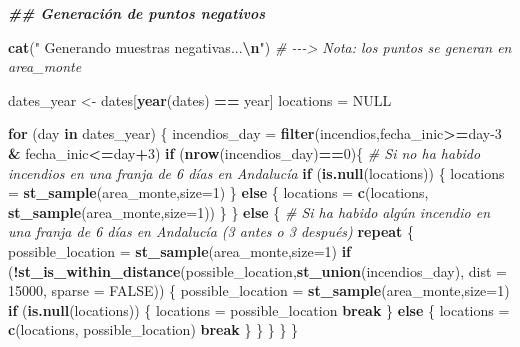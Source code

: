 \documentclass[12pt,a4paper,]{book}
\newenvironment{Shaded}{\begin{snugshade}}{\end{snugshade}}
\newcommand{\AttributeTok}[1]{\textcolor[rgb]{0.13,0.29,0.53}{#1}}
\newcommand{\CommentTok}[1]{\textcolor[rgb]{0.56,0.35,0.01}{\textit{#1}}}
\newcommand{\ConstantTok}[1]{\textcolor[rgb]{0.56,0.35,0.01}{#1}}
\newcommand{\ControlFlowTok}[1]{\textcolor[rgb]{0.13,0.29,0.53}{\textbf{#1}}}
\newcommand{\DecValTok}[1]{\textcolor[rgb]{0.00,0.00,0.81}{#1}}
\newcommand{\DocumentationTok}[1]{\textcolor[rgb]{0.56,0.35,0.01}{\textbf{\textit{#1}}}}
\newcommand{\FunctionTok}[1]{\textcolor[rgb]{0.13,0.29,0.53}{\textbf{#1}}}
\newcommand{\NormalTok}[1]{#1}
\newcommand{\OtherTok}[1]{\textcolor[rgb]{0.56,0.35,0.01}{#1}}
\newcommand{\SpecialCharTok}[1]{\textcolor[rgb]{0.81,0.36,0.00}{\textbf{#1}}}
\newcommand{\StringTok}[1]{\textcolor[rgb]{0.31,0.60,0.02}{#1}}
\numberwithin{dummy}{section}
\theoremstyle{ocrenumbox}
\theoremstyle{blacknumex}
\theoremstyle{blacknumbox}
\theoremstyle{ocrenum}
\theoremstyle{ocrenum}
\begin{document}
\begin{Shaded}
\begin{Highlighting}[]
  \DocumentationTok{\#\# Generación de puntos negativos}
  
  \FunctionTok{cat}\NormalTok{(}\StringTok{"  Generando muestras negativas...}\SpecialCharTok{\textbackslash{}n}\StringTok{"}\NormalTok{)}
  \CommentTok{\# {-}{-}{-}\textgreater{} Nota: los puntos se generan en area\_monte}
  
\NormalTok{  dates\_year }\OtherTok{\textless{}{-}}\NormalTok{ dates[}\FunctionTok{year}\NormalTok{(dates) }\SpecialCharTok{==}\NormalTok{ year]}
\NormalTok{  locations }\OtherTok{=} \ConstantTok{NULL}
  
  \ControlFlowTok{for}\NormalTok{ (day }\ControlFlowTok{in}\NormalTok{ dates\_year) \{}
\NormalTok{    incendios\_day }\OtherTok{=} \FunctionTok{filter}\NormalTok{(incendios,fecha\_inic}\SpecialCharTok{\textgreater{}=}\NormalTok{day}\DecValTok{{-}3} \SpecialCharTok{\&}\NormalTok{ fecha\_inic}\SpecialCharTok{\textless{}=}\NormalTok{day}\SpecialCharTok{+}\DecValTok{3}\NormalTok{)}
    \ControlFlowTok{if}\NormalTok{ (}\FunctionTok{nrow}\NormalTok{(incendios\_day)}\SpecialCharTok{==}\DecValTok{0}\NormalTok{)\{ }\CommentTok{\# Si no ha habido incendios en una franja de 6 días en Andalucía}
      \ControlFlowTok{if}\NormalTok{ (}\FunctionTok{is.null}\NormalTok{(locations)) \{}
\NormalTok{        locations }\OtherTok{=} \FunctionTok{st\_sample}\NormalTok{(area\_monte,}\AttributeTok{size=}\DecValTok{1}\NormalTok{)}
\NormalTok{      \} }\ControlFlowTok{else}\NormalTok{ \{}
\NormalTok{        locations }\OtherTok{=} \FunctionTok{c}\NormalTok{(locations, }\FunctionTok{st\_sample}\NormalTok{(area\_monte,}\AttributeTok{size=}\DecValTok{1}\NormalTok{))}
\NormalTok{      \}}
\NormalTok{    \} }\ControlFlowTok{else}\NormalTok{ \{ }\CommentTok{\# Si ha habido algún incendio en una franja de 6 días en Andalucía (3 antes o 3 después)}
      \ControlFlowTok{repeat}\NormalTok{ \{}
\NormalTok{        possible\_location }\OtherTok{=} \FunctionTok{st\_sample}\NormalTok{(area\_monte,}\AttributeTok{size=}\DecValTok{1}\NormalTok{)}
        \ControlFlowTok{if}\NormalTok{ (}\SpecialCharTok{!}\FunctionTok{st\_is\_within\_distance}\NormalTok{(possible\_location,}\FunctionTok{st\_union}\NormalTok{(incendios\_day), }\AttributeTok{dist =} \DecValTok{15000}\NormalTok{, }\AttributeTok{sparse =} \ConstantTok{FALSE}\NormalTok{)) \{}
\NormalTok{          possible\_location }\OtherTok{=} \FunctionTok{st\_sample}\NormalTok{(area\_monte,}\AttributeTok{size=}\DecValTok{1}\NormalTok{)}
          \ControlFlowTok{if}\NormalTok{ (}\FunctionTok{is.null}\NormalTok{(locations)) \{}
\NormalTok{            locations }\OtherTok{=}\NormalTok{ possible\_location}
            \ControlFlowTok{break}
\NormalTok{          \} }\ControlFlowTok{else}\NormalTok{ \{}
\NormalTok{            locations }\OtherTok{=} \FunctionTok{c}\NormalTok{(locations, possible\_location)}
            \ControlFlowTok{break}
\NormalTok{          \}}
\NormalTok{        \}}
\NormalTok{      \}}
\NormalTok{    \}}
\NormalTok{  \}}
  

\end{Highlighting}
\end{Shaded}
\end{document}
